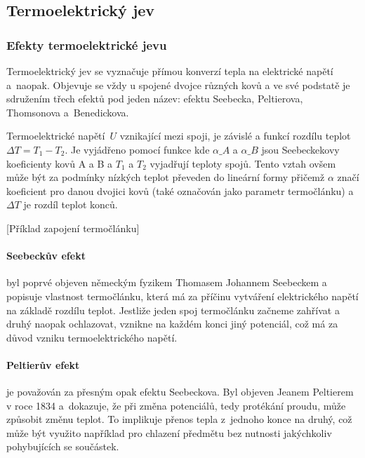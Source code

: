\subsection{Termoelektrický jev}
\subsubsection{Efekty termoelektrické jevu}
Termoelektrický jev se vyznačuje přímou konverzí tepla na elektrické napětí
a~naopak. Objevuje se vždy u spojené dvojce různých kovů a ve své podstatě je
sdružením třech efektů pod jeden název: efektu Seebecka, Peltierova, Thomsonova
a~Benedickova.~\cite{praktikum,diplomka}

Termoelektrické napětí~$U$ vznikající mezi spoji, je závislé a funkcí rozdílu
teplot~$\Delta T = T_1 - T_2$. Je vyjádřeno pomocí funkce
kde $\alpha\_A$ a $\alpha\_B$ jsou Seebeckekovy koeficienty kovů A a B a $T_1$
a $T_2$ vyjadřují teploty spojů.  Tento vztah ovšem může být za podmínky
nízkých teplot převeden do lineární formy
přičemž $\alpha$ značí koeficient pro danou dvojici kovů (také označován jako
parametr termočlánku) a $\Delta T$ je rozdíl teplot konců.~\cite{diplomka}

[Příklad zapojení
termočlánku]

\paragraph{Seebeckův efekt} byl poprvé objeven německým fyzikem Thomasem
Johannem Seebeckem a popisuje vlastnost termočlánku, která má za příčinu
vytváření elektrického napětí na základě rozdílu teplot. Jestliže jeden spoj
termočlánku začneme zahřívat a druhý naopak ochlazovat, vznikne na každém konci
jiný potenciál, což má za důvod vzniku termoelektrického
napětí.~\cite{jreichl-seebeck}

\paragraph{Peltierův efekt} je považován za přesným opak efektu Seebeckova. Byl
objeven Jeanem Peltierem v roce 1834 a~dokazuje, že při změna potenciálů, tedy
protékání proudu, může způsobit změnu teplot. To implikuje přenos tepla
z~jednoho konce na druhý, což může být využito například pro chlazení předmětu
bez nutnosti jakýchkoliv pohybujících se součástek.~\cite{peltier}

